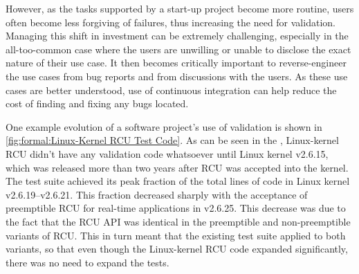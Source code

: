 However, as the tasks supported by a start-up project become more routine,
users often become less forgiving of failures, thus increasing the need
for validation.
Managing this shift in investment can be extremely challenging,
especially in the all-too-common case where the users are unwilling
or unable to disclose the exact nature of their use case.
It then becomes critically important to reverse-engineer the
use cases from bug reports and from discussions with the users.
As these use cases are better understood, use of continuous integration
can help reduce the cost of finding and fixing any bugs located.


One example evolution of a software project's use of validation is
shown in
\cref{fig:formal:Linux-Kernel RCU Test Code}.
As can be seen in the ,
Linux-kernel RCU didn't have any validation code whatsoever until Linux
kernel v2.6.15, which was released more than two years after RCU was
accepted into the kernel.
The test suite achieved its peak fraction of the total lines of code
in Linux kernel v2.6.19--v2.6.21.
This fraction decreased sharply with the acceptance of preemptible RCU
for real-time applications in v2.6.25.
This decrease was due to the fact that the RCU API was identical
in the preemptible and non-preemptible variants of RCU\@.
This in turn meant that the existing test suite applied to both variants,
so that even though the Linux-kernel RCU code expanded significantly,
there was no need to expand the tests.

